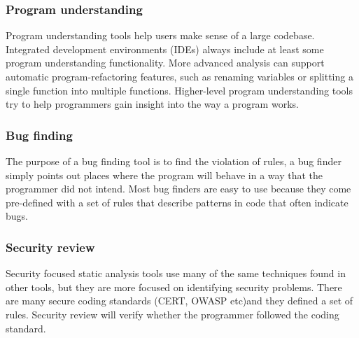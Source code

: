\subsubsection{Program understanding}
Program understanding tools help users make sense of a large codebase.
Integrated development environments (IDEs) always include at least some program understanding functionality. More advanced analysis can support automatic program-refactoring features, such as renaming variables or splitting a single function into multiple
functions. Higher-level program understanding tools try to help programmers gain insight into the way a program works.  
\subsubsection{Bug finding}
The purpose of a bug finding tool is to find the violation of rules, a bug finder simply points out places where the program will behave in a way that the programmer did not intend. Most bug finders are easy to use because they come pre-defined with a set of rules that describe patterns in code that often indicate bugs.
\subsubsection{Security review}
Security focused static analysis tools use many of the same techniques found in other tools, but they are more focused on identifying security problems. There are many secure coding standards (CERT, OWASP etc)and they defined a set of rules. Security review will verify whether the programmer followed the coding standard.
 